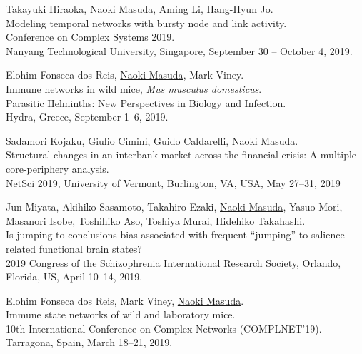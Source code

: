 \documentclass[11pt,letter]{article}
\begin{document}
\begin{etaremune}
\item Takayuki Hiraoka, \underline{Naoki Masuda}, Aming Li, Hang-Hyun Jo.\\
Modeling temporal networks with bursty node and link activity.\\
Conference on Complex Systems 2019.\\
Nanyang Technological University, Singapore, September 30 -- October 4, 2019.

\item Elohim Fonseca dos Reis, \underline{Naoki Masuda}, Mark Viney.\\
Immune networks in wild mice, \textit{Mus musculus domesticus}.\\
Parasitic Helminths: New Perspectives in Biology and Infection.\\
Hydra, Greece, September 1--6, 2019.

\item Sadamori Kojaku, Giulio Cimini, Guido Caldarelli, \underline{Naoki Masuda}.\\
Structural changes in an interbank market across the financial crisis: A multiple core-periphery analysis.\\
NetSci 2019, University of Vermont, Burlington, VA, USA, May 27--31, 2019

\item Jun Miyata, Akihiko Sasamoto, Takahiro Ezaki, \underline{Naoki Masuda}, Yasuo Mori, Masanori Isobe, Toshihiko Aso, Toshiya Murai, Hidehiko Takahashi.\\
Is jumping to conclusions bias associated with frequent ``jumping'' to salience-related functional brain states?\\
2019 Congress of the Schizophrenia International Research Society, Orlando, Florida, US, April 10--14, 2019.

\item Elohim Fonseca dos Reis, Mark Viney, \underline{Naoki Masuda}.\\
Immune state networks of wild and laboratory mice.\\
10th International Conference on Complex Networks (COMPLNET'19).\\
Tarragona, Spain, March 18--21, 2019.


\end{etaremune}
\end{document}
